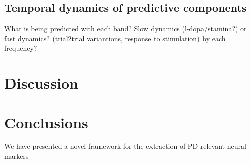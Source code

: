 \documentclass[10pt,a4paper]{article}
\begin{document}
\subsection{Temporal dynamics of predictive components}
What is being predicted with each band? Slow dynamics (l-dopa/stamina?) or fast dynamics? (trial2trial variantions, response to stimulation) by each frequency?
\section{Discussion}






\section{Conclusions}
We have presented a novel framework for the extraction of PD-relevant neural markers




\end{document}
